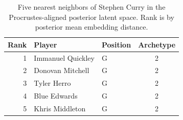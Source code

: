 \begin{table}[htbp]
  \centering\small
  \begin{tabular}{rllc}
    \toprule
    Rank & Player & Position & Archetype \\
    \midrule
    1 & Immanuel Quickley & G & 2 \\
    2 & Donovan Mitchell & G & 2 \\
    3 & Tyler Herro & G & 2 \\
    4 & Blue Edwards & G & 2 \\
    5 & Khris Middleton & G & 2 \\
    \bottomrule
  \end{tabular}
  \caption{Five nearest neighbors of Stephen Curry in the Procrustes-aligned posterior latent space. Rank is by posterior mean embedding distance.}
  \label{tab:Stephen_Curry_neighbors}
\end{table}

